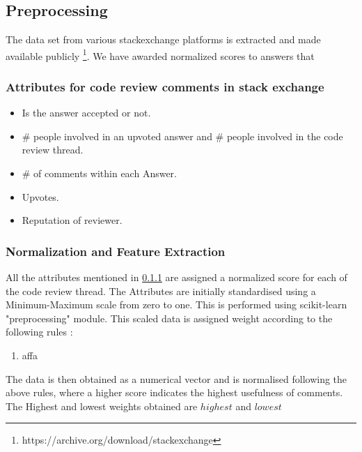 \documentclass[conference]{IEEEtran}
\begin{document}
\subsection{Preprocessing}
The data set from various stackexchange platforms is extracted and made available publicly \footnote{https://archive.org/download/stackexchange}. We have awarded normalized scores to answers that 

\subsubsection{Attributes for code review comments in stack exchange} \label{Attributes}


\begin{itemize}
\item Is the answer accepted or not.
\item \# people involved in an upvoted answer and \# people involved in the code review thread.
\item \# of comments within each Answer.
\item Upvotes.
\item Reputation of reviewer.
\end{itemize}

\subsubsection{Normalization and Feature Extraction}

All the attributes mentioned in \ref{Attributes} are assigned a normalized score for each of the code review thread. The Attributes  are initially standardised using a Minimum-Maximum scale from zero to one. This is performed using scikit-learn "preprocessing" module. This scaled data is assigned weight according to the following rules :

\begin{enumerate}
\item affa
\end{enumerate}
The data is then obtained as a numerical vector and is normalised following the above rules, where a higher score indicates the highest usefulness of comments. The Highest and lowest weights obtained are $highest$ and $lowest$
\end{document}
